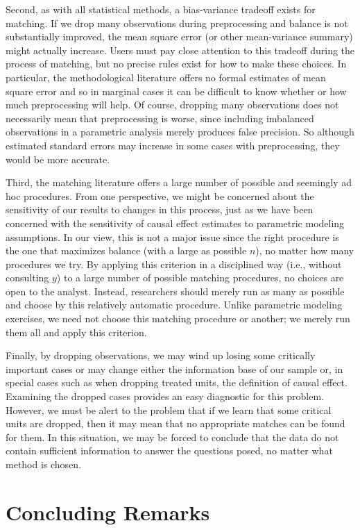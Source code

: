 \documentclass[11pt,titlepage]{article}
\begin{document}
Second, as with all statistical methods, a bias-variance tradeoff
exists for matching.  If we drop many observations during
preprocessing and balance is not substantially improved, the mean
square error (or other mean-variance summary) might actually increase.
Users must pay close attention to this tradeoff during the process of
matching, but no precise rules exist for how to make these choices.
In particular, the methodological literature offers no formal
estimates of mean square error and so in marginal cases it can be
difficult to know whether or how much preprocessing will help.  Of
course, dropping many observations does not necessarily mean that
preprocessing is worse, since including imbalanced observations in a
parametric analysis merely produces false precision.  So although
estimated standard errors may increase in some cases with
preprocessing, they would be more accurate.

Third, the matching literature offers a large number of possible and
seemingly ad hoc procedures.  From one perspective, we might be
concerned about the sensitivity of our results to changes in this
process, just as we have been concerned with the sensitivity of causal
effect estimates to parametric modeling assumptions.  In our view,
this is not a major issue since the right procedure is the one that
maximizes balance (with a large as possible $n$), no matter how many
procedures we try.  By applying this criterion in a disciplined way
(i.e., without consulting $y$) to a large number of possible matching
procedures, no choices are open to the analyst.  Instead, researchers
should merely run as many as possible and choose by this relatively
automatic procedure.  Unlike parametric modeling exercises, we need
not choose this matching procedure or another; we merely run them all
and apply this criterion.

Finally, by dropping observations, we may wind up losing some
critically important cases or may change either the information base
of our sample or, in special cases such as when dropping treated
units, the definition of causal effect.  Examining the dropped cases
provides an easy diagnostic for this problem.  However, we must be
alert to the problem that if we learn that some critical units are
dropped, then it may mean that no appropriate matches can be found for
them.  In this situation, we may be forced to conclude that the data
do not contain sufficient information to answer the questions posed,
no matter what method is chosen.

\section{Concluding Remarks}
\end{document}

